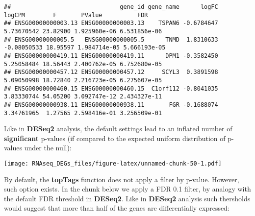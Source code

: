 \documentclass[]{book}
\newenvironment{Shaded}{\begin{snugshade}}{\end{snugshade}}
\newcommand{\KeywordTok}[1]{\textcolor[rgb]{0.13,0.29,0.53}{\textbf{#1}}}
\newcommand{\DataTypeTok}[1]{\textcolor[rgb]{0.13,0.29,0.53}{#1}}
\newcommand{\FloatTok}[1]{\textcolor[rgb]{0.00,0.00,0.81}{#1}}
\newcommand{\StringTok}[1]{\textcolor[rgb]{0.31,0.60,0.02}{#1}}
\newcommand{\CommentTok}[1]{\textcolor[rgb]{0.56,0.35,0.01}{\textit{#1}}}
\newcommand{\OperatorTok}[1]{\textcolor[rgb]{0.81,0.36,0.00}{\textbf{#1}}}
\newcommand{\NormalTok}[1]{#1}
\begin{document}
\begin{verbatim}
##                               gene_id gene_name      logFC      logCPM        F       PValue          FDR
## ENSG00000000003.13 ENSG00000000003.13    TSPAN6 -0.6784647  5.73670542 23.82900 1.925960e-06 6.531856e-06
## ENSG00000000005.5   ENSG00000000005.5      TNMD  1.8310633 -0.08050533 18.95597 1.984714e-05 5.666193e-05
## ENSG00000000419.11 ENSG00000000419.11      DPM1 -0.3582450  5.25058484 18.56443 2.400762e-05 6.752680e-05
## ENSG00000000457.12 ENSG00000000457.12     SCYL3  0.3891598  5.09050998 18.72840 2.216723e-05 6.275607e-05
## ENSG00000000460.15 ENSG00000000460.15  C1orf112 -0.8041035  3.83330744 54.05200 3.092747e-12 2.434327e-11
## ENSG00000000938.11 ENSG00000000938.11       FGR -0.1688074  3.34761965  1.27565 2.598416e-01 3.256509e-01
\end{verbatim}

Like in \textbf{DESeq2} analysis, the default settings lead to an
inflated number of \textbf{significant} p-values (if compared to the
expected uniform distribution of p-values under the null):

\begin{Shaded}
\end{Shaded}

\texttt{[image: RNAseq\_DEGs\_files/figure-latex/unnamed-chunk-50-1.pdf]}

By default, the \textbf{topTags} function does not apply a filter by
p-value. However, such option exists. In the chunk below we apply a FDR
0.1 filter, by analogy with the default FDR threshold in
\textbf{DESeq2}. Like in \textbf{DESeq2} analysis such thersholds would
suggest that more than half of the genes are differentially expressed:

\begin{Shaded}
\end{Shaded}
\end{document}
